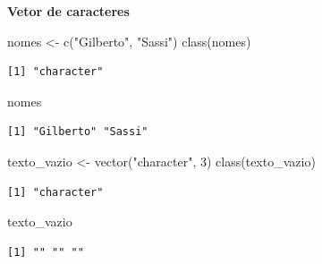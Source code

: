 \documentclass[
  10pt,
  ignorenonframetext,
]{beamer}
\newenvironment{Shaded}{\begin{snugshade}}{\end{snugshade}}
\newcommand{\DecValTok}[1]{\textcolor[rgb]{0.68,0.00,0.00}{#1}}
\newcommand{\FunctionTok}[1]{\textcolor[rgb]{0.28,0.35,0.67}{#1}}
\newcommand{\NormalTok}[1]{\textcolor[rgb]{0.00,0.23,0.31}{#1}}
\newcommand{\OtherTok}[1]{\textcolor[rgb]{0.00,0.23,0.31}{#1}}
\newcommand{\StringTok}[1]{\textcolor[rgb]{0.13,0.47,0.30}{#1}}
\begin{document}
\begin{frame}[fragile]
\textbf{Vetor de caracteres}

\begin{Shaded}
\begin{Highlighting}[]
\NormalTok{nomes  }\OtherTok{\textless{}{-}} \FunctionTok{c}\NormalTok{(}\StringTok{"Gilberto"}\NormalTok{, }\StringTok{"Sassi"}\NormalTok{)}
\FunctionTok{class}\NormalTok{(nomes)}
\end{Highlighting}
\end{Shaded}

\begin{verbatim}
[1] "character"
\end{verbatim}

\begin{Shaded}
\begin{Highlighting}[]
\NormalTok{nomes}
\end{Highlighting}
\end{Shaded}

\begin{verbatim}
[1] "Gilberto" "Sassi"   
\end{verbatim}

\begin{Shaded}
\begin{Highlighting}[]
\NormalTok{texto\_vazio }\OtherTok{\textless{}{-}} \FunctionTok{vector}\NormalTok{(}\StringTok{"character"}\NormalTok{, }\DecValTok{3}\NormalTok{)}
\FunctionTok{class}\NormalTok{(texto\_vazio)}
\end{Highlighting}
\end{Shaded}

\begin{verbatim}
[1] "character"
\end{verbatim}

\begin{Shaded}
\begin{Highlighting}[]
\NormalTok{texto\_vazio}
\end{Highlighting}
\end{Shaded}

\begin{verbatim}
[1] "" "" ""
\end{verbatim}
\end{frame}
\end{document}
